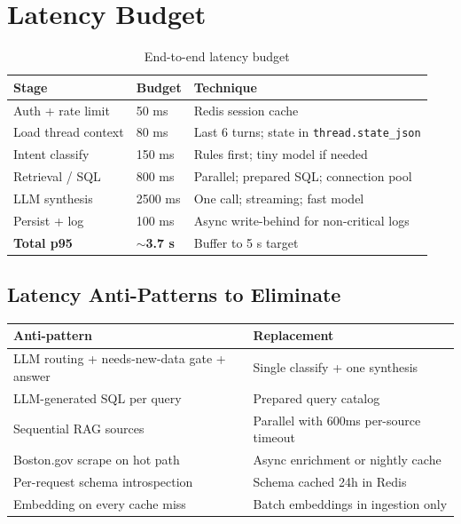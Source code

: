 \documentclass[11pt,a4paper]{article}
\begin{document}
\section{Latency Budget}

\begin{table}[h]
\centering
\small
\begin{tabular}{@{}lll@{}}
\toprule
\textbf{Stage} & \textbf{Budget} & \textbf{Technique} \\
\midrule
Auth + rate limit & 50 ms & Redis session cache \\
Load thread context & 80 ms & Last 6 turns; state in \texttt{thread.state\_json} \\
Intent classify & 150 ms & Rules first; tiny model if needed \\
Retrieval / SQL & 800 ms & Parallel; prepared SQL; connection pool \\
LLM synthesis & 2500 ms & One call; streaming; fast model \\
Persist + log & 100 ms & Async write-behind for non-critical logs \\
\textbf{Total p95} & \textbf{$\sim$3.7 s} & Buffer to 5 s target \\
\bottomrule
\end{tabular}
\caption{End-to-end latency budget}
\end{table}

\subsection{Latency Anti-Patterns to Eliminate}
\begin{table}[h]
\centering
\small
\begin{tabular}{@{}ll@{}}
\toprule
\textbf{Anti-pattern} & \textbf{Replacement} \\
\midrule
LLM routing + needs-new-data gate + answer & Single classify + one synthesis \\
LLM-generated SQL per query & Prepared query catalog \\
Sequential RAG sources & Parallel with 600ms per-source timeout \\
Boston.gov scrape on hot path & Async enrichment or nightly cache \\
Per-request schema introspection & Schema cached 24h in Redis \\
Embedding on every cache miss & Batch embeddings in ingestion only \\
\bottomrule
\end{tabular}
\end{table}
\end{document}
